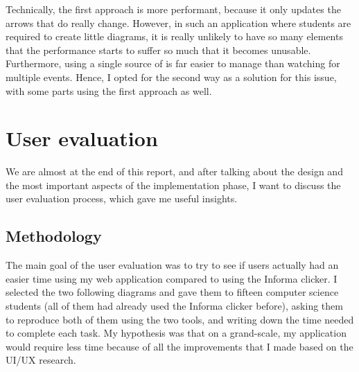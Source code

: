 \documentclass[]{usiinfbachelorproject}
\begin{document}
\noindent Technically, the first approach is more performant, because it only updates the arrows that do really change. However, in such an application where students are required to create little diagrams, it is really unlikely to have so many elements that the performance starts to suffer so much that it becomes unusable. Furthermore, using a single source of is far easier to manage than watching for multiple events. Hence, I opted for the second way as a solution for this issue, with some parts using the first approach as well.


\vspace{\fill}

\pagebreak

\section{User evaluation} \label{Testing}


We are almost at the end of this report, and after talking about the design and the most important aspects of the implementation phase, I want to discuss the user evaluation process, which gave me useful insights.

\subsection{Methodology}

The main goal of the user evaluation was to try to see if users actually had an easier time using my web application compared to using the Informa clicker. I selected the two following diagrams and gave them to fifteen computer science students (all of them had already used the Informa clicker before), asking them to reproduce both of them using the two tools, and writing down the time needed to complete each task. My hypothesis was that on a grand-scale, my application would require less time because of all the improvements that I made based on the UI/UX research.
\end{document}

